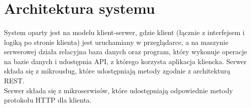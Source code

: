 \documentclass{article}
\begin{document}
	\section{Architektura systemu}
	\paragraph{} System oparty jest na modelu klient-serwer, gdzie klient (łącznie z interfejsem i logiką po stronie klienta) jest uruchamiany w przeglądarce, a na maszynie serwerowej działa relacyjna baza danych oraz program, który wykonuje operacje na bazie danych i udostępnia API, z którego korzysta aplikacja kliencka. Serwer składa się z mikrousług, które udostępniają metody zgodnie z architekturą REST. \\[0.5cm]
	Serwer składa się z mikroserwisów, które udostępniają odpowiednie metody protokołu HTTP dla klienta.
\end{document}
